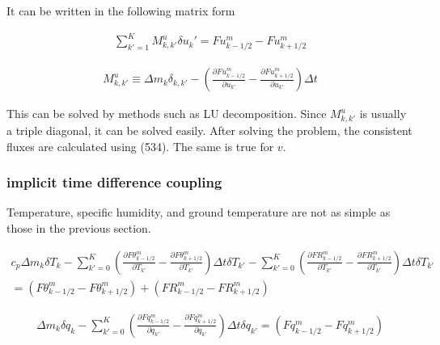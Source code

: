 It can be written in the following matrix form

\begin{eqnarray}
  \sum_{k'=1}^{K} M^u_{k,k'} \delta u_k' = Fu^{m}_{k-1/2} - Fu^{m}_{k+1/2}
\end{eqnarray}

\begin{eqnarray}
M^u_{k,k'} \equiv \Delta m_k \delta_{k,k'}
          -  \left(  \frac{\partial{Fu^{m}_{k-1/2}}}{\partial {u_{k'}}}
                   - \frac{\partial{Fu^{m}_{k+1/2}}}{\partial {u_{k'}}} \right) \Delta t
\end{eqnarray}

This can be solved by methods such as LU decomposition. Since
\(M^u_{k,k'}\) is usually a triple diagonal, it can be solved easily.
After solving the problem, the consistent fluxes are calculated using
(534). The same is true for \(v\).

\hypertarget{implicit-time-difference-coupling}{%
\subsubsection{implicit time difference
coupling}\label{implicit-time-difference-coupling}}

Temperature, specific humidity, and ground temperature are not as simple
as those in the previous section.

\begin{eqnarray}
  c_p \Delta m_k \delta T_k
   -  \sum_{k'=0}^{K}
                 \left(  \frac{\partial{F\theta^{m}_{k-1/2}}}{\partial {T_{k'}}}
                       - \frac{\partial{F\theta^{m}_{k+1/2}}}{\partial {T_{k'}}} \right)
                 \Delta t\delta T_{k'}
  - \sum_{k'=0}^{K}
                 \left(  \frac{\partial{FR^{m}_{k-1/2}}}{\partial {T_{k'}}}
                       - \frac{\partial{FR^{m}_{k+1/2}}}{\partial {T_{k'}}} \right)
                 \Delta t\delta T_{k'}  \\
  =   ( F\theta^{m}_{k-1/2} - F\theta^{m}_{k+1/2} )
  + ( FR^{m}_{k-1/2} - FR^{m}_{k+1/2} )
\end{eqnarray}

\begin{eqnarray}
  \Delta m_k \delta q_k
  -  \sum_{k'=0}^{K} \left(  \frac{\partial{Fq^{m}_{k-1/2}}}{\partial {q_{k'}}}
                            - \frac{\partial{Fq^{m}_{k+1/2}}}{\partial {q_{k'}}} \right)
                 \Delta t\delta q_{k'}
  = ( Fq^{m}_{k-1/2} - Fq^{m}_{k+1/2} )
\end{eqnarray}

